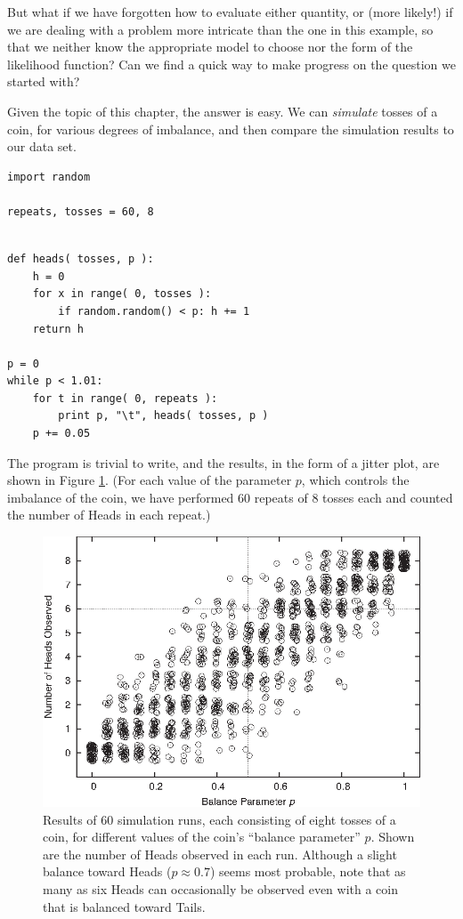But what if we have forgotten how to evaluate either quantity, or
(more likely!)  if we are dealing with a problem more intricate than
the one in this example, so that we neither know the appropriate model to
choose nor the form of the likelihood function? Can we find a quick
way to make progress on the question we started with?

Given the topic of this chapter, the answer is easy. We can
\emph{simulate} tosses of a coin, for various degrees of imbalance,
and then compare the simulation results to our data set.

\begin{verbatim}
import random

repeats, tosses = 60, 8
\end{verbatim}
\begin{verbatim}

def heads( tosses, p ):
    h = 0
    for x in range( 0, tosses ):
        if random.random() < p: h += 1
    return h

p = 0
while p < 1.01:
    for t in range( 0, repeats ):
        print p, "\t", heads( tosses, p )
    p += 0.05
\end{verbatim}

The program is trivial to write, and the results, in the form of a
jitter plot, are shown in Figure \ref{fig:simulation2}. (For each
value of the parameter $p$, which controls the imbalance of the coin,
we have performed 60 repeats of 8 tosses each and counted the number
of Heads in each repeat.)

\begin{figure}
  \centerline{\includegraphics{img/simulation2}}
  \caption{Results of 60 simulation runs, each consisting of eight tosses
    of a coin, for different values of the coin's ``balance
    parameter'' $p$.  Shown are the number of Heads observed in each
    run.  Although a slight balance toward Heads ($p \approx 0.7$)
    seems most probable, note that as many as six Heads can
    occasionally be observed even with a coin that is balanced toward
    Tails.}
  \label{fig:simulation2}
\end{figure}

